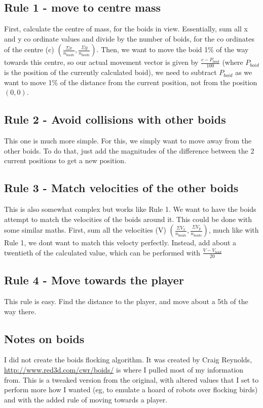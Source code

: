 \subsection{Rule 1 - move to centre mass}
First, calculate the centre of mass, for the boids in view. Essentially, sum all x and y co ordinate values and divide by the number of boids, for the co ordinates of the centre (c) $(\frac{\Sigma x}{n_{boids}},\frac{\Sigma y}{n_{boids}})$. Then, we want to move the boid 1\% of the way towards this centre, so our actual movement vector is given by $\frac{c - P_{boid}}{100}$ (where $P_{boid}$ is the position of the currently calculated boid), we need to subtract $P_{boid}$ as we want to move 1\% of the distance from the current position, not from the position $(0,0)$.
    
\subsection{Rule 2 - Avoid collisions with other boids}
This one is much more simple. For this, we simply want to move away from the other boids. To do that, just add the magnitudes of the difference between the 2 current positions to get a new position. 

\subsection{Rule 3 - Match velocities of the other boids}
This is also somewhat complex but works like Rule 1. We want to have the boids attempt to match the velocities of the boids around it. This could be done with some similar maths. First, sum all the velocities (V) $(\frac{\Sigma V_x}{n_{boids}},\frac{\Sigma V_y}{n_{boids}})$, much like with Rule 1, we dont want to match this velocty perfectly. Instead, add about a twentieth of the calculated value, which can be performed with $\frac{V - V_{boid}}{20}$

\subsection{Rule 4 - Move towards the player}
This rule is easy. Find the distance to the player, and move about a 5th of the way there.

\subsection{Notes on boids}
I did not create the boids flocking algorithm. It was created by Craig Reynolds, \url{http://www.red3d.com/cwr/boids/} is where I pulled most of my information from. This is a tweaked version from the original, with altered values that I set to perform more how I wanted (eg, to emulate a hoard of robots over flocking birds) and with the added rule of moving towards a player. 

